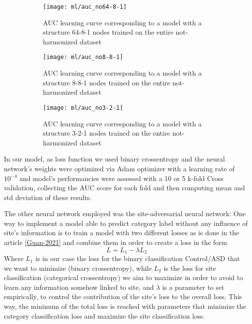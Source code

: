 \documentclass[a4paper,11pt]{article}
\begin{document}
\begin{figure}
\centering
\begin{subfigure}[b]{0.3\textwidth}
   \texttt{[image: ml/auc\_no64-8-1]}
   \caption{AUC learning curve corresponding to a model with a structure 64-8-1 nodes trained on the entire not-harmonized dataset}
   \label{fig:auc_no64-8-1}
\end{subfigure}
\begin{subfigure}[b]{0.3\textwidth}
   \texttt{[image: ml/auc\_no8-8-1]}
   \caption{AUC learning curve corresponding to a model with a structure 8-8-1 nodes trained on the entire not-harmonized dataset}
   \label{fig:auc_no8-8-1}
\end{subfigure}
\begin{subfigure}[b]{0.3\textwidth}
   \texttt{[image: ml/auc\_no3-2-1]}
   \caption{AUC learning curve corresponding to a model with a structure 3-2-1 nodes trained on the entire not-harmonized dataset}
   \label{fig:auc_no3-2-1}
\end{subfigure}
\caption{}
\label{fig:learningcurve}
\end{figure}




In our model, as loss function we used binary crossentropy and the neural network's weights were optimized via Adam optimizer with a learning rate of $10^{-4}$ and model's performancies were assessed with a 10 or 5 k-fold Cross validation, collecting the AUC score for each fold and then computing mean and std deviation of these results.

The other neural network employed was the site-adversarial neural network:
One way to implement a model able to predict category label without any influence of site's information is to train a model with two different losses as is done in the article \ref{Guan-2021} and combine them in order to create a loss in the form
\begin{equation}
L = L_1 - \lambda L_2
\end{equation}
Where $L_1$  is in our case the loss for the binary classification Control/ASD that we want to minimize (binary crossentropy), while $L_2$ is the loss for site classification (categorical crossentropy) we aim to maximize in order to avoid to learn any information somehow linked to site, and $\lambda $ is a parameter to set empirically, to control the contribution of the site's loss to the overall loss.
This way, the minimum of the total loss is reached with parameters that minimize the category classification loss and maximize the site classification loss.
\end{document}
